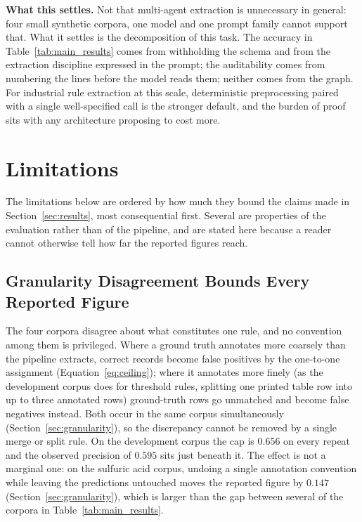\documentclass[11pt]{article}
\begin{document}
\textbf{What this settles.} Not that multi-agent extraction is unnecessary in
general: four small synthetic corpora, one model and one prompt family cannot
support that. What it settles is the decomposition of this task. The accuracy in
Table~\ref{tab:main_results} comes from withholding the schema and from the
extraction discipline expressed in the prompt; the auditability comes from
numbering the lines before the model reads them; neither comes from the graph.
For industrial rule extraction at this scale, deterministic preprocessing
paired with a single well-specified call is the stronger default, and the
burden of proof sits with any architecture proposing to cost more.

\section{Limitations}
\label{sec:limitations}

The limitations below are ordered by how much they bound the claims made in
Section~\ref{sec:results}, most consequential first. Several are properties of
the evaluation rather than of the pipeline, and are stated here because a reader
cannot otherwise tell how far the reported figures reach.

\subsection{Granularity Disagreement Bounds Every Reported Figure}
\label{sec:lim_granularity}
The four corpora disagree about what constitutes one rule, and no convention
among them is privileged. Where a ground truth annotates more coarsely than the
pipeline extracts, correct records become false positives by the one-to-one
assignment (Equation~\ref{eq:ceiling}); where it annotates more finely (as the
development corpus does for threshold rules, splitting one printed table row into
up to three annotated rows) ground-truth rows go unmatched and become false
negatives instead. Both occur in the same corpus simultaneously
(Section~\ref{sec:granularity}), so the discrepancy cannot be removed by a single
merge or split rule. On the development corpus the cap is $0.656$ on every
repeat and the observed precision of $0.595$ sits just beneath it. The effect is
not a marginal one: on the sulfuric acid corpus, undoing a single annotation
convention while leaving the predictions untouched moves the reported figure by
$0.147$ (Section~\ref{sec:granularity}), which is larger than the gap between
several of the corpora in Table~\ref{tab:main_results}.
\end{document}
